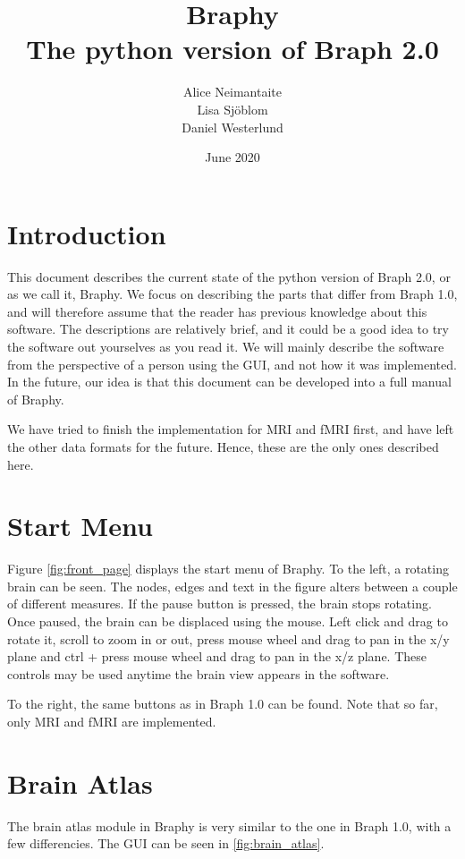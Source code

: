 \documentclass{article}
\title{%
	Braphy \\
	\large The python version of Braph 2.0}
\author{Alice Neimantaite \\ Lisa Sjöblom \\ Daniel Westerlund}
\date{June 2020}
\begin{document}
\maketitle
\clearpage

\section{Introduction}

This document describes the current state of the python version of Braph 2.0, or as we call it, Braphy. We focus on describing the parts that differ from Braph 1.0, and will therefore assume that the reader has previous knowledge about this software. The descriptions are relatively brief, and it could be a good idea to try the software out yourselves as you read it. We will mainly describe the software from the perspective of a person using the GUI, and not how it was implemented. In the future, our idea is that this document can be developed into a full manual of Braphy.

We have tried to finish the implementation for MRI and fMRI first, and have left the other data formats for the future. Hence, these are the only ones described here.

\section{Start Menu}

Figure \ref{fig:front_page} displays the start menu of Braphy. To the left, a rotating brain can be seen. The nodes, edges and text in the figure alters between a couple of different measures. If the pause button is pressed, the brain stops rotating. Once paused, the brain can be displaced using the mouse. Left click and drag to rotate it, scroll to zoom in or out, press mouse wheel and drag to pan in the x/y plane and ctrl + press mouse wheel and drag to pan in the x/z plane. These controls may be used anytime the brain view appears in the software.

To the right, the same buttons as in Braph 1.0 can be found. Note that so far, only MRI and fMRI are implemented. 

\section{Brain Atlas}

The brain atlas module in Braphy is very similar to the one in Braph 1.0, with a few differencies. The GUI can be seen in \cref{fig:brain_atlas}.
\end{document}
